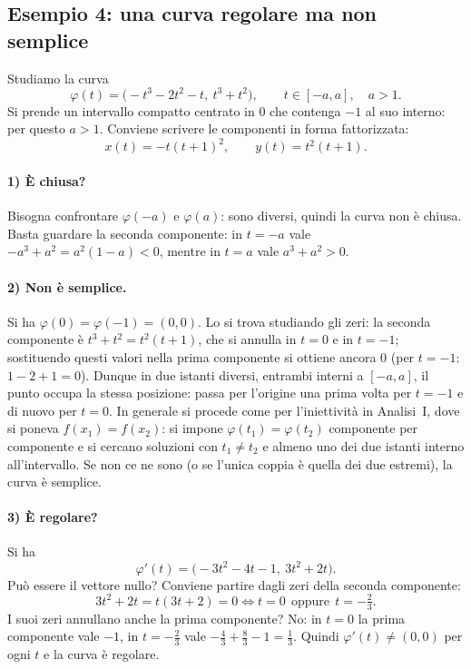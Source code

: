 \subsection{Esempio 4: una curva regolare ma non semplice}

Studiamo la curva
\[
\varphi(t)=\bigl(-t^3-2t^2-t,\ t^3+t^2\bigr),\qquad t\in[-a,a],\quad a>1.
\]
Si prende un intervallo compatto centrato in $0$ che contenga $-1$ al suo interno: per
questo $a>1$. Conviene scrivere le componenti in forma fattorizzata:
\[
x(t)=-t(t+1)^2,\qquad y(t)=t^2(t+1).
\]

\paragraph{1) È chiusa?} Bisogna confrontare $\varphi(-a)$ e $\varphi(a)$: sono diversi,
quindi la curva non è chiusa.
Basta guardare la seconda componente: in $t=-a$ vale $-a^3+a^2=a^2(1-a)<0$, mentre in
$t=a$ vale $a^3+a^2>0$.

\paragraph{2) Non è semplice.} Si ha $\varphi(0)=\varphi(-1)=(0,0)$.
Lo si trova studiando gli zeri: la seconda componente è $t^3+t^2=t^2(t+1)$, che si
annulla in $t=0$ e in $t=-1$; sostituendo questi valori nella prima componente si
ottiene ancora $0$ (per $t=-1$: $1-2+1=0$). Dunque in due istanti diversi, entrambi
interni a $[-a,a]$, il punto occupa la stessa posizione: passa per l'origine una prima
volta per $t=-1$ e di nuovo per $t=0$.
In generale si procede come per l'iniettività in Analisi~I, dove si poneva
$f(x_1)=f(x_2)$: si impone $\varphi(t_1)=\varphi(t_2)$ componente per componente e si
cercano soluzioni con $t_1\neq t_2$ e almeno uno dei due istanti interno all'intervallo.
Se non ce ne sono (o se l'unica coppia è quella dei due estremi), la curva è semplice.

\paragraph{3) È regolare?} Si ha
\[
\varphi'(t)=\bigl(-3t^2-4t-1,\ 3t^2+2t\bigr).
\]
Può essere il vettore nullo? Conviene partire dagli zeri della seconda componente:
\[
3t^2+2t=t(3t+2)=0\iff t=0\ \ \text{oppure}\ \ t=-\tfrac23 .
\]
I suoi zeri annullano anche la prima componente? No:
in $t=0$ la prima componente vale $-1$, in $t=-\frac23$ vale
$-\frac43+\frac83-1=\frac13$. Quindi $\varphi'(t)\neq(0,0)$ per ogni $t$ e la curva è
regolare.

